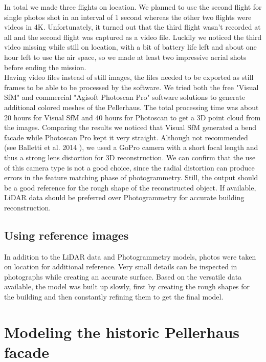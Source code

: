 In total we made three flights on location. We planned to use the second flight for single photos shot in an interval of 1 second whereas the other two flights were videos in 4K. Unfortunately, it turned out that the third flight wasn't recorded at all and the second flight was captured as a video file. Luckily we noticed the third video missing while still on location, with a bit of battery life left and about one hour left to use the air space, so we made at least two impressive aerial shots before ending the mission.\\

Having video files instead of still images, the files needed to be exported as still frames to be able to be processed by the software. We tried both the free "Visual SfM" and commercial "Agisoft Photoscan Pro" software solutions to generate additional colored meshes of the Pellerhaus. The total processing time was about 20 hours for Visual SfM and 40 hours for Photoscan to get a 3D point cloud from the images. Comparing the results we noticed that Visual SfM generated a bend facade while Photoscan Pro kept it very straight. Although not recommended (see Balletti et al. 2014 \parencite{calibration_of_action_cameras}), we used a GoPro camera with a short focal length and thus a strong lens distortion for 3D reconstruction. We can confirm that the use of this camera type is not a good choice, since the radial distortion can produce errors in the feature matching phase of photogrammetry. Still, the output should be a good reference for the rough shape of the reconstructed object. If available, LiDAR data should be preferred over Photogrammetry for accurate building reconstruction.

\subsection{Using reference images}

In addition to the LiDAR data and Photogrammetry models, photos were taken on location for additional reference. Very small details can be inspected in photographs while creating an accurate surface. Based on the versatile data available, the model was built up slowly, first by creating the rough shapes for the building and then constantly refining them to get the final model.

\pagebreak

\section{Modeling the historic Pellerhaus facade}

